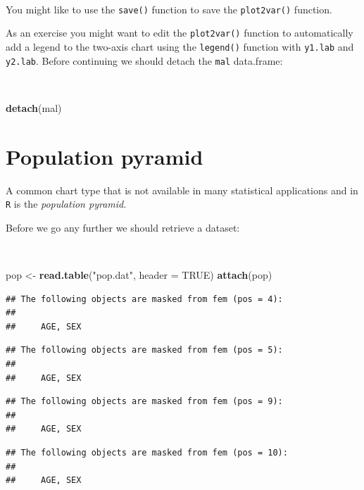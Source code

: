 \documentclass[12pt,a4paper]{book}
\newenvironment{Shaded}{\begin{snugshade}}{\end{snugshade}}
\newcommand{\KeywordTok}[1]{\textcolor[rgb]{0.13,0.29,0.53}{\textbf{#1}}}
\newcommand{\DataTypeTok}[1]{\textcolor[rgb]{0.13,0.29,0.53}{#1}}
\newcommand{\StringTok}[1]{\textcolor[rgb]{0.31,0.60,0.02}{#1}}
\newcommand{\OtherTok}[1]{\textcolor[rgb]{0.56,0.35,0.01}{#1}}
\newcommand{\NormalTok}[1]{#1}
\theoremstyle{definition}
\theoremstyle{definition}
\theoremstyle{definition}
\theoremstyle{remark}
\begin{document}
~

You might like to use the \texttt{save()} function to save the
\texttt{plot2var()} function.

As an exercise you might want to edit the \texttt{plot2var()} function
to automatically add a legend to the two-axis chart using the
\texttt{legend()} function with \texttt{y1.lab} and \texttt{y2.lab}.
Before continuing we should detach the \texttt{mal} data.frame:

~

\begin{Shaded}
\begin{Highlighting}[]
\KeywordTok{detach}\NormalTok{(mal)}
\end{Highlighting}
\end{Shaded}

\hypertarget{population-pyramid}{%
\section{Population pyramid}\label{population-pyramid}}

A common chart type that is not available in many statistical
applications and in \texttt{R} is the \emph{population pyramid}.

Before we go any further we should retrieve a dataset:

~

\begin{Shaded}
\begin{Highlighting}[]
\NormalTok{pop <-}\StringTok{ }\KeywordTok{read.table}\NormalTok{(}\StringTok{"pop.dat"}\NormalTok{, }\DataTypeTok{header =} \OtherTok{TRUE}\NormalTok{)}
\KeywordTok{attach}\NormalTok{(pop)}
\end{Highlighting}
\end{Shaded}

\begin{verbatim}
## The following objects are masked from fem (pos = 4):
## 
##     AGE, SEX
\end{verbatim}

\begin{verbatim}
## The following objects are masked from fem (pos = 5):
## 
##     AGE, SEX
\end{verbatim}

\begin{verbatim}
## The following objects are masked from fem (pos = 9):
## 
##     AGE, SEX
\end{verbatim}

\begin{verbatim}
## The following objects are masked from fem (pos = 10):
## 
##     AGE, SEX
\end{verbatim}
\end{document}
